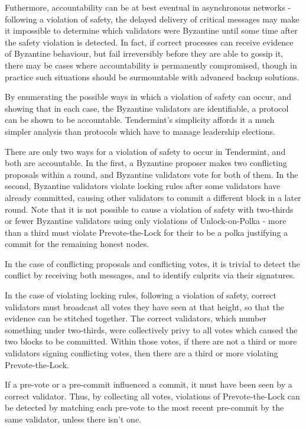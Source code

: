 Futhermore, accountability can be at best eventual in asynchronous networks - 
following a violation of safety, the delayed delivery of critical messages
may make it impossible to determine which validators were Byzantine until some time after
the safety violation is detected. 
In fact, if correct processes can receive evidence of Byzantine behaviour, 
but fail irreversibly before they are able to gossip it, 
there may be cases where accountability is permanently compromised,
though in practice such situations should be surmountable
with advanced backup solutions.

By enumerating the possible ways in which a violation of safety can occur,
and showing that in each case, the Byzantine validators are identifiable,
a protocol can be shown to be accountable.
Tendermint's simplicity affords it a much simpler analysis than protocols 
which have to manage leadership elections.

There are only two ways for a violation of safety to occur in Tendermint,
and both are accountable.
In the first, a Byzantine proposer makes two conflicting proposals within a round,
and Byzantine validators vote for both of them.
In the second, Byzantine validators violate locking rules after some validators have already committed,
causing other validators to commit a different block in a later round.
Note that it is not possible to cause a violation of safety with two-thirds or fewer
Byzantine validators using only violations of Unlock-on-Polka - 
more than a third must violate Prevote-the-Lock for their to be a polka justifying a commit 
for the remaining honest nodes.

In the case of conflicting proposals and conflicting votes,
it is trivial to detect the conflict by receiving both messages,
and to identify culprits via their signatures.

In the case of violating locking rules, following a violation of safety,
correct validators must broadcast all votes they have seen at that height, 
so that the evidence can be stitched together.
The correct validators, which number something under two-thirds, 
were collectively privy to all votes which caused the two blocks to be committed.
Within those votes, if there are not a third or more validators signing conflicting votes,
then there are a third or more violating Prevote-the-Lock.

If a pre-vote or a pre-commit influenced a commit, it must have been seen by a correct validator.
Thus, by collecting all votes, violations of Prevote-the-Lock can be detected
by matching each pre-vote to the most recent pre-commit by the same validator, unless there isn't one.


